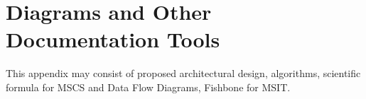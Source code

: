 %
%
%                 

\chapter{Diagrams and Other Documentation Tools}
\label{sec:appendixa}


This appendix may consist of proposed architectural design, algorithms, scientific formula for 
MSCS and Data Flow Diagrams, Fishbone for MSIT.


